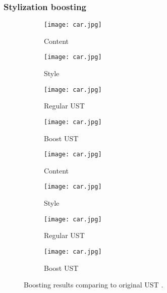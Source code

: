 \subsubsection{Stylization boosting}
\begin{figure}[H]
	\centering
	\begin{subfigure}[b]{0.4\linewidth}
		\texttt{[image: car.jpg]} %
		\caption{Content}
	\end{subfigure}
	\begin{subfigure}[b]{0.4\linewidth}
		\texttt{[image: car.jpg]} %
		\caption{Style}
	\end{subfigure}
	\begin{subfigure}[b]{0.4\linewidth}
		\texttt{[image: car.jpg]} %
		\caption{Regular UST}
	\end{subfigure}
	\begin{subfigure}[b]{0.4\linewidth}
		\texttt{[image: car.jpg]} %
		\caption{Boost UST}
	\end{subfigure}
	\centering
	\begin{subfigure}[b]{0.4\linewidth}
		\texttt{[image: car.jpg]} %
		\caption{Content}
	\end{subfigure}
	\begin{subfigure}[b]{0.4\linewidth}
		\texttt{[image: car.jpg]} %
		\caption{Style}
	\end{subfigure}
	\begin{subfigure}[b]{0.4\linewidth}
		\texttt{[image: car.jpg]} %
		\caption{Regular UST}
	\end{subfigure}
	\begin{subfigure}[b]{0.4\linewidth}
		\texttt{[image: car.jpg]} %
		\caption{Boost UST}
	\end{subfigure}
	\caption{Boosting results comparing to original UST \cite{bib11}.}
	\label{fig:Boost}
\end{figure}
